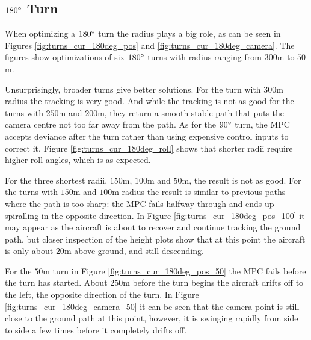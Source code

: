 \subsection{$180\degree$ Turn}
\label{subsec:180}

When optimizing a $180\degree$ turn the radius plays a big role, as can be seen in Figures \ref{fig:turns_cur_180deg_pos} and \ref{fig:turns_cur_180deg_camera}. The figures show optimizations of six $180\degree$ turns with radius ranging from $300$m to $50$m.

Unsurprisingly, broader turns give better solutions. For the turn with $300$m radius the tracking is very good. And while the tracking is not as good for the turns with $250$m and $200$m, they return a smooth stable path that puts the camera centre not too far away from the path. As for the $90\degree$ turn, the MPC accepts deviance after the turn rather than using expensive control inputs to correct it. Figure \ref{fig:turns_cur_180deg_roll} shows that shorter radii require higher roll angles, which is as expected.

For the three shortest radii, $150$m, $100$m and $50$m, the result is not as good. For the turns with $150$m and $100$m radius the result is similar to previous paths where the path is too sharp: the MPC fails halfway through and ends up spiralling in the opposite direction. In Figure \ref{fig:turns_cur_180deg_pos_100} it may appear as the aircraft is about to recover and continue tracking the ground path, but closer inspection of the height plots show that at this point the aircraft is only about $20$m above ground, and still descending.

For the $50$m turn in Figure \ref{fig:turns_cur_180deg_pos_50} the MPC fails before the turn has started. About $250$m before the turn begins the aircraft drifts off to the left, the opposite direction of the turn. In Figure \ref{fig:turns_cur_180deg_camera_50} it can be seen that the camera point is still close to the ground path at this point, however, it is swinging rapidly from side to side a few times before it completely drifts off.

